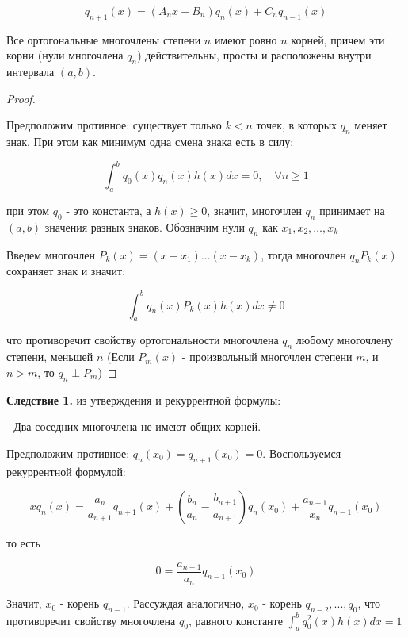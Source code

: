 \documentclass[12pt, a4paper]{report}
\begin{document}
\[ q_{n+1 }(x )= (A_n x + B_n ) q_n (x ) + C_nq_{n-1 } ( x) \] 

\begin{proposition}
    Все ортогональные многочлены степени \( n  \) имеют ровно \( n  \)  корней, причем эти корни (нули многочлена \( q_n \)) действительны, просты и расположены внутри интервала \( (a, b) .\) 
\end{proposition}

\begin{proof}
    \[  \] 
    
    Предположим противное: существует только \( k<n  \) точек, в которых \( q_n  \) меняет знак. При этом как минимум одна смена знака есть в силу: 

    \[ \int_{a }^{b } q_0 (x ) q_n (x ) h(x )dx = 0 ,\quad  \forall  n \ge 1 \] 

    при этом \( q_0      \) - это константа, а \( h(x ) \ge 0  \), значит, многочлен \( q_n \) принимает на \( (a,b) \) значения разных знаков. Обозначим нули \( q_n \)  как \( x_1 , x_2, \ldots, x_k \) 

    Введем многочлен \( P_k (x )= (x - x_1 )...(x- x_k) \), тогда многочлен \( q_n P_k(x ) \) сохраняет знак и значит: 

    \[ \int_{a }^{b } q_n(x ) P_k(x ) h(x )dx \neq 0  \] 

    что противоречит свойству ортогональности многочлена \( q_n \) любому многочлену степени, меньшей \( n \) (Если \( P_m(x) \) - произвольный многочлен степени \( m  \), и \( n>m \), то \( q_n \perp P_m \))
\end{proof}

\begin{flushleft}  
    \textbf{Следствие 1.} из утверждения и рекуррентной формулы: 

    - Два соседних многочлена не имеют общих корней. 

    Предположим противное: \( q_n (x_0)  = q_{n +1 } (x_0 ) = 0\). Воспользуемся рекуррентной формулой: 

    \[ x q_n (x ) = \frac{a_n } {a_{n+1 } } q_{n+1 } (x ) + \left(  \frac{b_n }{a_n } - \frac{b_{n +1 } }{a_{n +1 } }   \right) q_{n } (x_0 ) + \frac{a_{n - 1 } }{x_n }  q_{n -1 } (x_0) \] 

    то есть 

    \[ 0 = \frac{a_{n -1 } }{a_n } q_{n -1 } (x_0 )  \] 

    Значит, \( x_0  \)  - корень \( q_{n-1}  \). Рассуждая аналогично, \( x_0  \) - корень \( q_{n-2 } ,..., q_0  \), что противоречит свойству многочлена \( q_0 \), равного константе \(\displaystyle  \int_{a }^{b } q_0 ^2 (x )h(x )dx =1  \) 
\end{flushleft}
\end{document}
